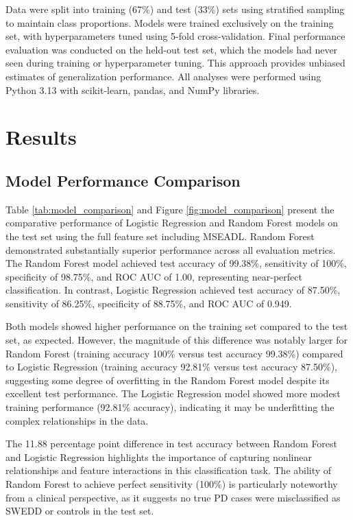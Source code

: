 \documentclass[12pt,a4paper]{article}
\begin{document}
Data were split into training (67\%) and test (33\%) sets using stratified sampling to maintain class proportions. Models were trained exclusively on the training set, with hyperparameters tuned using 5-fold cross-validation. Final performance evaluation was conducted on the held-out test set, which the models had never seen during training or hyperparameter tuning. This approach provides unbiased estimates of generalization performance. All analyses were performed using Python 3.13 with scikit-learn, pandas, and NumPy libraries.

\section{Results}

\subsection{Model Performance Comparison}

Table \ref{tab:model_comparison} and Figure \ref{fig:model_comparison} present the comparative performance of Logistic Regression and Random Forest models on the test set using the full feature set including MSEADL. Random Forest demonstrated substantially superior performance across all evaluation metrics. The Random Forest model achieved test accuracy of 99.38\%, sensitivity of 100\%, specificity of 98.75\%, and ROC AUC of 1.00, representing near-perfect classification. In contrast, Logistic Regression achieved test accuracy of 87.50\%, sensitivity of 86.25\%, specificity of 88.75\%, and ROC AUC of 0.949.

Both models showed higher performance on the training set compared to the test set, as expected. However, the magnitude of this difference was notably larger for Random Forest (training accuracy 100\% versus test accuracy 99.38\%) compared to Logistic Regression (training accuracy 92.81\% versus test accuracy 87.50\%), suggesting some degree of overfitting in the Random Forest model despite its excellent test performance. The Logistic Regression model showed more modest training performance (92.81\% accuracy), indicating it may be underfitting the complex relationships in the data.

The 11.88 percentage point difference in test accuracy between Random Forest and Logistic Regression highlights the importance of capturing nonlinear relationships and feature interactions in this classification task. The ability of Random Forest to achieve perfect sensitivity (100\%) is particularly noteworthy from a clinical perspective, as it suggests no true PD cases were misclassified as SWEDD or controls in the test set.
\end{document}
